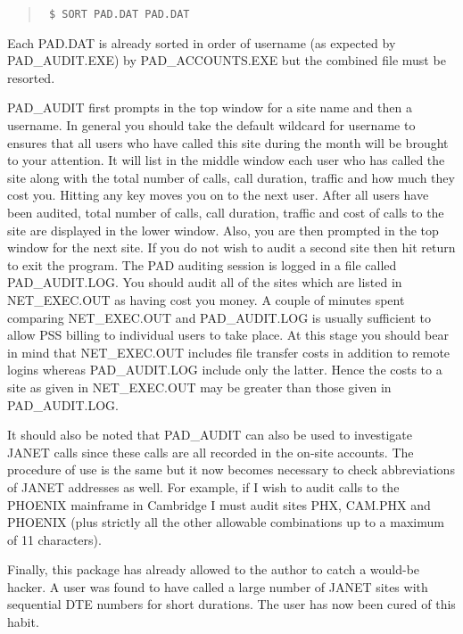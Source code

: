 \begin{enumerate}
\begin{quote} \tt
\$ SORT PAD.DAT PAD.DAT 
\end{quote}

Each PAD.DAT is already sorted in order of username (as expected by
PAD\_\/AUDIT.EXE) by PAD\_\/ACCOUNTS.EXE but the combined file must be resorted. 

PAD\_\/AUDIT first prompts in the top window for a site name and then a
username. In general you should take the default wildcard for username to
ensures that all users who have called this site during the month will be
brought to your attention. It will list in the middle window each user who
has called the site along with the total number of calls, call duration,
traffic and how much they cost you. Hitting any key moves you on to the next
user. After all users have been audited, total number of calls, call
duration, traffic and cost of calls to the site are displayed in the lower
window. Also, you are then prompted in the top window for the next site. If
you do not wish to audit a second site then hit return to exit the program.
The PAD auditing session is logged in a file called PAD\_\/AUDIT.LOG. You
should audit all of the sites which are listed in NET\_\/EXEC.OUT as having
cost you money. A couple of minutes spent comparing NET\_\/EXEC.OUT and
PAD\_\/AUDIT.LOG is usually sufficient to allow PSS billing to individual users
to take place. At this stage you should bear in mind that NET\_EXEC.OUT
includes file transfer costs in addition to remote logins whereas 
PAD\_AUDIT.LOG include only the latter. Hence the costs to a site
as given in NET\_EXEC.OUT may be greater than those given in PAD\_AUDIT.LOG.

It should also be noted that PAD\_\/AUDIT can also be used to investigate JANET
calls since these calls are all recorded in the on-site accounts. The
procedure of use is the same but it now becomes necessary to check
abbreviations of JANET addresses as well. For example, if I wish to audit
calls to the PHOENIX mainframe in Cambridge I must audit sites PHX, CAM.PHX
and PHOENIX (plus strictly all the other allowable combinations up to a
maximum of 11 characters).

Finally, this package has already allowed to the author to catch a would-be
hacker. A user was found to have called a large number of JANET sites 
with sequential DTE numbers for short durations. The user has now been 
cured of this habit.

\end{enumerate}

